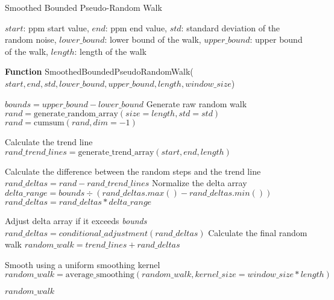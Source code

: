 \begin{algorithm}[t!]
\caption{Smoothed Bounded Pseudo-Random Walk} \label{alg:smoothed bounded pseudo-random walk}
\begin{algorithmic}[1]
\Require $start$: ppm start value, $end$: ppm end value, $std$: standard deviation of the random noise, $lower\_bound$: lower bound of the walk, $upper\_bound$: upper bound of the walk, $length$: length of the walk
\end{algorithmic}

\textbf{Function} SmoothedBoundedPseudoRandomWalk($start, end, std, lower\_bound, upper\_bound, length, window\_size$)
\begin{algorithmic}[1]
\State $bounds = upper\_bound - lower\_bound$
\Statex Generate raw random walk
\State $rand = \text{generate\_random\_array}(size=length, std=std)$
\State $rand = \text{cumsum}(rand, dim=-1)$

\Statex Calculate the trend line
\State $rand\_trend\_lines = \text{generate\_trend\_array}(start, end, length)$

\Statex Calculate the difference between the random steps and the trend line
\State $rand\_deltas = rand - rand\_trend\_lines$
\Statex Normalize the delta array
\State $delta\_range = bounds \div (rand\_deltas.max() - rand\_deltas.min())$
\State $rand\_deltas = rand\_deltas * delta\_range$

\Statex Adjust delta array if it exceeds \textit{bounds}
\State $rand\_deltas = conditional\_adjustment(rand\_deltas)$
\Statex Calculate the final random walk
\State $random\_walk = trend\_lines + rand\_deltas$

\Statex Smooth using a uniform smoothing kernel
\State $random\_walk = \text{average\_smoothing}(random\_walk, kernel\_size=window\_size * length)$

\Statex \Return $random\_walk$ %
\end{algorithmic}
\end{algorithm}
